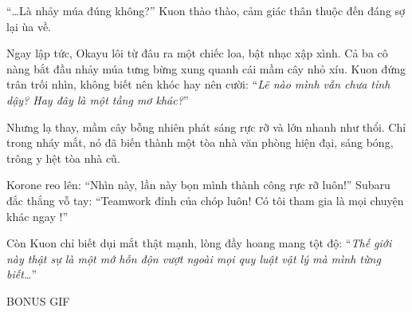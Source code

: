 \documentclass[../main.tex]{subfiles}
\begin{document}
``\dots Là nhảy múa đúng không?'' Kuon thào thào, cảm giác thân thuộc đến đáng sợ lại ùa về.

Ngay lập tức, Okayu lôi từ đâu ra một chiếc loa, bật nhạc xập xình. Cả ba cô nàng bắt đầu nhảy múa tưng bừng xung quanh cái mầm cây nhỏ xíu. Kuon đứng trân trối nhìn, không biết nên khóc hay nên cười: ``\textit{Lẽ nào mình vẫn chưa tỉnh dậy? Hay đây là một tầng mơ khác?}''

Nhưng lạ thay, mầm cây bỗng nhiên phát sáng rực rỡ và lớn nhanh như thổi. Chỉ trong nháy mắt, nó đã biến thành một tòa nhà văn phòng hiện đại, sáng bóng, trông y hệt tòa nhà cũ.

Korone reo lên: ``Nhìn này, lần này bọn mình thành công rực rỡ luôn!'' Subaru đắc thắng vỗ tay: ``Teamwork đỉnh của chóp luôn! Có tôi tham gia là mọi chuyện khác ngay !''

Còn Kuon chỉ biết dụi mắt thật mạnh, lòng đầy hoang mang tột độ: ``\textit{Thế giới này thật sự là một mớ hỗn độn vượt ngoài mọi quy luật vật lý mà mình từng biết\dots}''

\begin{center}
  {\ab BONUS GIF}
\end{center}
\end{document}
